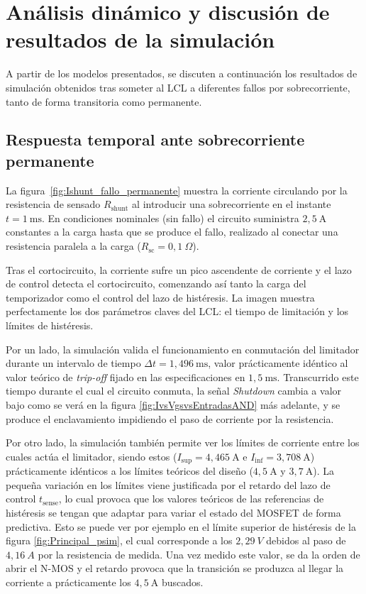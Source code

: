 \documentclass[12pt]{report} %
\begin{document}
\section{Análisis dinámico y discusión de resultados de la simulación}
\label{subsec:analisis_dinamico}
A partir de los modelos presentados, se discuten a continuación los resultados de simulación obtenidos tras someter al LCL a diferentes fallos por sobrecorriente, tanto de forma transitoria como permanente. 
\subsection{Respuesta temporal ante sobrecorriente permanente}
\label{subsubsec:corto_permanente}
La figura~\ref{fig:Ishunt_fallo_permanente} muestra la corriente circulando por la resistencia de sensado $R_{\text{shunt}}$ al introducir una sobrecorriente en el instante $t = 1~\text{ms}$. En condiciones nominales (sin fallo) el circuito suministra $2{,}5~\text{A}$ constantes a la carga hasta que se produce el fallo, realizado al conectar una resistencia paralela a la carga ($R_{\text{sc}} = 0{,}1~\Omega$).

Tras el cortocircuito, la corriente sufre un pico ascendente de corriente y el lazo de control detecta el cortocircuito, comenzando así tanto la carga del temporizador como el control del lazo de histéresis. La imagen muestra perfectamente los dos parámetros claves del LCL: el tiempo de limitación y los límites de histéresis. 

Por un lado, la simulación valida el funcionamiento en conmutación del limitador durante un intervalo de tiempo $\Delta t = 1{,}496~\text{ms}$, valor prácticamente idéntico al valor teórico de \textit{trip-off} fijado en las especificaciones en $1{,}5~\text{ms}$. Transcurrido este tiempo durante el cual el circuito conmuta, la señal \textit{Shutdown} cambia a valor bajo como se verá en la figura \ref{fig:IvsVgsvsEntradasAND} más adelante, y se produce el enclavamiento impidiendo el paso de corriente por la resistencia. 

Por otro lado, la simulación también permite ver los límites de corriente entre los cuales actúa el limitador, siendo estos ($I_{\text{sup}} = 4{,}465~\text{A}$ e $I_{\text{inf}} = 3{,}708~\text{A}$) prácticamente idénticos a los límites teóricos del diseño ($4{,}5~\text{A}$ y $3{,}7~\text{A}$). La pequeña variación en los límites viene justificada por el retardo del lazo de control $t_{\text{sense}}$, lo cual provoca que los valores teóricos de las referencias de histéresis se tengan que adaptar para variar el estado del MOSFET de forma predictiva. Esto se puede ver por ejemplo en el límite superior de histéresis de la figura \ref{fig:Principal_psim}, el cual corresponde a los $2{,}29~V$ debidos al paso de $4{,}16~A$ por la resistencia de medida. Una vez medido este valor, se da la orden de abrir el N-MOS y el retardo provoca que la transición se produzca al llegar la corriente a prácticamente los $4{,}5~\text{A}$ buscados. 
\end{document}
